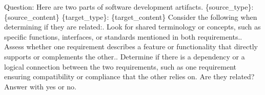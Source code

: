 Question: Here are two parts of software development artifacts.\newline
\newline
\{source\_type\}: \textquotesingle{}\textquotesingle{}\textquotesingle{}\{source\_content\}\textquotesingle{}\textquotesingle{}\textquotesingle{}\newline
\newline
\{target\_type\}: \textquotesingle{}\textquotesingle{}\textquotesingle{}\{target\_content\}\textquotesingle{}\textquotesingle{}\textquotesingle{}\newline
\newline
Consider the following when determining if they are related:. Look for shared terminology or concepts, such as specific functions, interfaces, or standards mentioned in both requirements.. Assess whether one requirement describes a feature or functionality that directly supports or complements the other.. Determine if there is a dependency or a logical connection between the two requirements, such as one requirement ensuring compatibility or compliance that the other relies on.\newline
\newline
Are they related?\newline
\newline
Answer with \textquotesingle{}yes\textquotesingle{} or \textquotesingle{}no\textquotesingle{}.